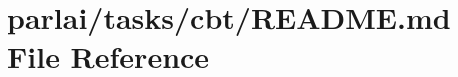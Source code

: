 \hypertarget{parlai_2tasks_2cbt_2README_8md}{}\section{parlai/tasks/cbt/\+R\+E\+A\+D\+ME.md File Reference}
\label{parlai_2tasks_2cbt_2README_8md}
